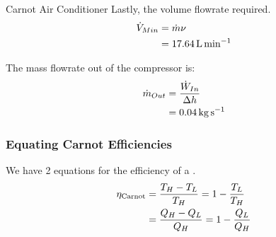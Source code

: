 \begin{example}{Carnot Air Conditioner}
  Lastly, the volume flowrate required.
  \begin{align*}
    \dot{V}_{Min} &= \dot{m} \nu \\
                             &= \SI{17.64}{\liter\per\minute}
  \end{align*}

  The mass flowrate out of the compressor is:
  \begin{align*}
    \dot{m}_{Out} &= \frac{\dot{W}_{In}}{\Delta h} \\
                           &= \SI{0.04}{\kilo\gram\per\second}
  \end{align*}
\end{example}

\subsubsection{Equating Carnot Efficiencies}\label{subsubsec:Equating_Carnot_Efficiencies}
We have 2 equations for the efficiency of a .
\begin{align*}
  \eta_{\text{Carnot}} &= \frac{T_{H} - T_{L}}{T_{H}} = 1 - \frac{T_{L}}{T_{H}} \\
                              &= \frac{Q_{H} - Q_{L}}{Q_{H}} = 1 - \frac{Q_{L}}{Q_{H}}
\end{align*}

